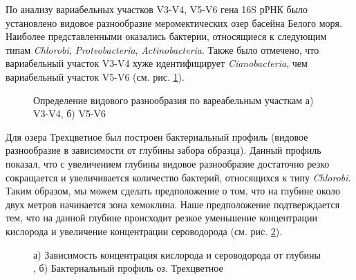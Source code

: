 По анализу вариабельных участков V3-V4, V5-V6 гена 16S рРНК было установлено видовое разнообразие меромектических озер басейна Белого моря. Наиболее представленными оказались бактерии, относящиеся к следующим типам \textit{Chlorobi}, \textit{Proteobacteria}, \textit{Actinobacteria}.  Также было отмечено, что вариабельный участок V3-V4 хуже идентифицирует \textit{Cianobacteria}, чем вариабельный участок V5-V6   (см. рис. \ref{ris:V3-V4, V5-V6}). 


\begin{figure}[h]
\begin{minipage}[h]{0.5\linewidth}
\end{minipage}
\hfill
\begin{minipage}[h]{0.5\linewidth}
\end{minipage}
\caption{Определение видового разнообразия по вареабельным участкам а) V3-V4, б) V5-V6}
\label{ris:V3-V4, V5-V6}
\end{figure}


Для озера Трехцветное был построен бактериальный профиль (видовое разнообразие в зависимости от глубины забора образца). Данный профиль показал, что с увеличением глубины видовое разнообразие достаточно резко сокращается и увеличивается количество бактерий, относящихся к типу   \textit{Chlorobi}. Таким образом, мы можем сделать предположение о том, что на глубине около двух метров начинается зона хемоклина. Наше предположение подтверждается тем, что на данной глубине происходит резкое уменьшение концентрации кислорода и увеличение концентрации сероводорода (см. рис. \ref{ris:concentr, 3cvet}).  

\begin{figure}[h]
\begin{minipage}[h]{0.5\linewidth}
\end{minipage}
\hfill
\begin{minipage}[h]{0.5\linewidth}
\end{minipage}
\caption{а) Зависимость концентрация кислорода и сероводорода от глубины , б) Бактериальный профиль оз. Трехцветное}
\label{ris:concentr, 3cvet}
\end{figure}

